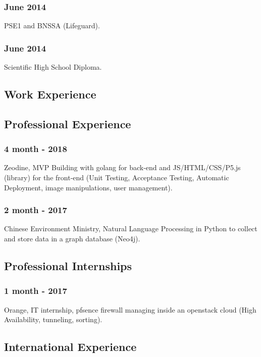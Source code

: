 \documentclass{article}
\begin{document}
        \subsubsection{June 2014}
            PSE1 and BNSSA (Lifeguard).
        \subsubsection{June 2014}
            Scientific High School Diploma.

    \vspace{1cm}

    \begin{multicols}{2}
        \section{Work Experience}
            \subsection{Professional Experience}
                \subsubsection{4 month - 2018}
                	Zeodine, MVP Building with golang for back-end and JS/HTML/CSS/P5.js (library) for the front-end (Unit Testing, Acceptance Testing, Automatic Deployment, image manipulations, user management).
                \subsubsection{2 month - 2017}
                    Chinese Environment Ministry, Natural Language Processing in Python to collect and store data in a graph database (Neo4j).
            \subsection{Professional Internships}
                \subsubsection{1 month - 2017}
                    Orange, IT internship, pfsence firewall managing inside an openstack cloud (High Availability, tunneling, sorting).
            \subsection{International Experience}

\end{multicols}
\end{document}
